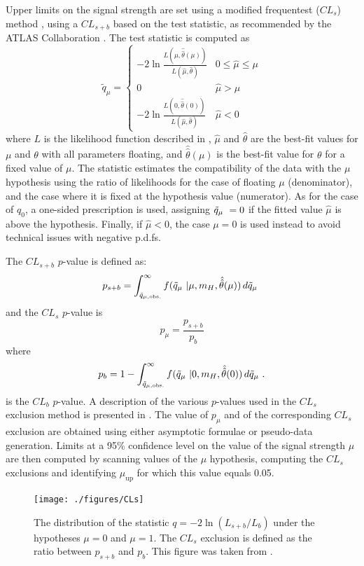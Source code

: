 Upper limits on the signal strength are set using a modified frequentest ($CL_s$)
method \cite{cls}, using a $CL_{s+b}$ based on the \qmu test statistic,
as recommended by the ATLAS Collaboration \cite{ATLAS_stat_recommendations}. 
The test statistic is computed as
\[
    \tilde q_{\mu} =
    \begin{cases}
        -2\ln{\frac{L(\mu,\hat{\hat\theta}(\mu))}{L(\hat\mu,\hat\theta)}} & 0 \le \hat\mu \le \mu \\
        0 & \hat\mu > \mu \\
        -2\ln{\frac{L(0,\hat{\hat\theta}(0))}{L(\hat\mu,\hat\theta)}} & \hat\mu < 0
    \end{cases}
\]
where $L$ is the likelihood function described in ,
$\hat\mu$ and $\hat\theta$ are the best-fit values for $\mu$ and $\theta$ with
all parameters floating, and $\hat{\hat\theta}(\mu)$ is the best-fit value for
$\theta$ for a fixed value of $\mu$. The statistic estimates the compatibility 
of the data with the $\mu$ hypothesis using the ratio of likelihoods for the case
of floating $\mu$ (denominator), and the case where it is fixed at the hypothesis
value (numerator). As for the case of $q_0$, a one-sided prescription is used,
assigning $\tilde q_{\mu}\  = 0$ if the fitted value $\hat\mu$ is above the hypothesis.
Finally, if $\hat\mu < 0$, the case $\mu=0$ is used instead to avoid technical
issues with negative p.d.fs.

The $CL_{s+b}$ $p$-value is defined as:
\[
    p_{s+b} = \int_{\tilde q_{\mu,\text{obs.}}}^{\infty} f(\tilde q_{\mu}\ |\mu,m_H,\hat{\hat\theta}(\mu))\,d\tilde q_{\mu}\ 
\]
and the $CL_s$ $p$-value is
\[
    p_{\mu} = \frac{p_{s+b}}{p_b}
\]
where
\[
    p_{b} = 1 - \int_{\tilde q_{\mu,\text{obs.}}}^{\infty} f(\tilde q_{\mu}\ |0,m_H,\hat{\hat\theta}(0))\,d\tilde q_{\mu}\ .
\]
is the $CL_b$ $p$-value. A description of the various $p$-values used in the $CL_s$
exclusion method is presented in .
The value of $p_{\mu}$ and of the corresponding $CL_s$ exclusion are obtained
using either asymptotic formulae \cite{Cowan:2010js} or pseudo-data generation.
Limits at a 95\% confidence level on the value of the signal strength $\mu$ are
then computed by scanning values of the $\mu$ hypothesis, computing the $CL_s$
exclusions and identifying $\mu_{\text{up}}$ for which this value equals 0.05.

\begin{figure}[htbp]
    \centering
    \texttt{[image: ./figures/CLs]}
    \caption{The distribution of the statistic $q = -2\ln(L_{s+b}/L_b)$ under the 
    hypotheses $\mu=0$ and $\mu=1$. The $CL_s$ exclusion is defined as the ratio
    between $p_{s+b}$ and $p_{b}$. This figure was taken from \cite{Cowan:2010js}.}
    \label{fig:cls}
\end{figure}

